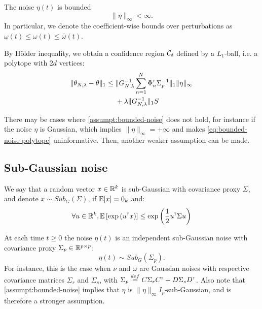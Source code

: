 \documentclass{article}
\begin{document}
\begin{assumption}
\label{assumpt:bounded-noise}
The noise $\eta(t)$ is bounded
\[
\|\eta\|_\infty < \infty.
\]
In particular, we denote the coefficient-wise bounds over perturbations as $\underline{\omega}(t) \leq \omega(t) \leq \overline{\omega}(t)$.
\end{assumption}

By Hölder inequality, we obtain a confidence region $\mathcal{C}_\delta$ defined by a $L_1$-ball, i.e. a polytope with $2d$ vertices:
\begin{equation}
\begin{split}
\label{eq:bounded-noise-polytope}
\|\theta_{N,\lambda} - \theta\|_1 \leq {} &\|G_{N, \lambda}^{-1}\sum_{n=1}^N \Phi_n^{\mathsf{\scriptscriptstyle T}} \Sigma_p^{-1}\|_1\|\eta\|_\infty \\
&+ \lambda\|G_{N, \lambda}^{-1}\|_1 S
\end{split}
\end{equation}

There may be cases where \autoref{assumpt:bounded-noise} does not hold, for instance if the noise $\eta$ is Gaussian, which implies $\|\eta\|_\infty=+\infty$ and makes \eqref{eq:bounded-noise-polytope} uninformative. Then, another weaker assumption can be made.

\subsection{Sub-Gaussian noise}

We say that a random vector $x\in\mathbb{R}^k$ is sub-Gaussian with covariance proxy $\Sigma$, and denote $x\sim Sub_G(\Sigma)$, if $\operatorname*{\mathbb{E}}[x] = 0_k$ and:
\[
\forall u\in\mathbb{R}^k, \operatorname*{\mathbb{E}} \left[ \exp{\left( u^{\mathsf{\scriptscriptstyle T}}x\right)}\right] \leq \exp{\left( \frac{1}{2} u^{\mathsf{\scriptscriptstyle T}}\Sigma u\right)}
\]

\begin{assumption}
\label{assumpt:gaussian-noise}
At each time $t\geq0$ the noise $\eta(t)$ is an independent sub-Gaussian noise with covariance proxy $\Sigma_p \in \mathbb{R}^{p\times p}$:
\begin{equation*}
    \eta(t) \sim Sub_G(\Sigma_p).
\end{equation*}
For instance, this is the case when $\nu$ and $\omega$ are Gaussian noises with respective covariance matrices $\Sigma_r$ and $\Sigma_s$, with $\Sigma_p \stackrel{def}{=} C\Sigma_r C^{\mathsf{\scriptscriptstyle T}} + D\Sigma_s D^{\mathsf{\scriptscriptstyle T}}$. Also note that \autoref{assumpt:bounded-noise} implies that $\eta$ is $\|\eta\|_\infty I_p$-sub-Gaussian, and is therefore a stronger assumption.
\end{assumption}
\end{document}
